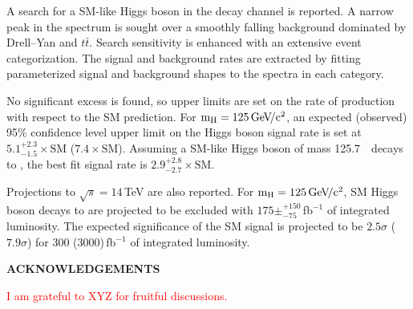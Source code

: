 \documentclass[10pt]{article}
\def\Acknowledgements{\bigskip  \bigskip \begin{center} \begin{large}
             \bf ACKNOWLEDGEMENTS \end{large}\end{center}}
\begin{document}
A search for a SM-like Higgs boson in the \mm{} decay channel is reported.
A narrow \hmm{} peak in the \Mmumu{} spectrum is sought over a smoothly
falling background dominated by Drell--Yan and $t\bar{t}$.  Search
sensitivity is enhanced with an extensive event categorization.  The
signal and background rates are extracted by fitting parameterized
signal and background shapes to the \Mmumu{} spectra in each category.

No significant excess is found, so upper limits are set on the
rate of \hmm{} production with respect to the SM prediction.
For $\mathrm{m_H}{}=125\,\mathrm{Ge\kern -0.1em V\!/c^2}{}$, an expected (observed) 95\% confidence level upper limit
on the Higgs boson signal rate is set at 
$5.1^{+2.3}_{-1.5}\times\mathrm{SM}$ ($7.4\times\mathrm{SM}$).
Assuming a SM-like Higgs boson of mass 125.7\,\GeVcc{}~\cite{CMS:yva} decays to \mm{},
the best fit signal rate is $2.9^{+2.8}_{-2.7}\times\mathrm{SM}$.

Projections to $\sqrt{s}=14$\,TeV are also reported.  For $\mathrm{m_H}{}=125\,\mathrm{Ge\kern -0.1em V\!/c^2}{}$,
SM Higgs boson decays to \mm{} are projected to be excluded with 
$175\pm^{+150}_{-75}$\,fb$^{-1}$ of integrated luminosity.  The expected significance
of the SM \hmm{} signal is projected to be 
$2.5\sigma$ ($7.9\sigma$) for 300 (3000)\,fb$^{-1}$ of integrated luminosity.

\Acknowledgements
\textcolor{red}{I am grateful to XYZ for fruitful discussions.}
\end{document}
